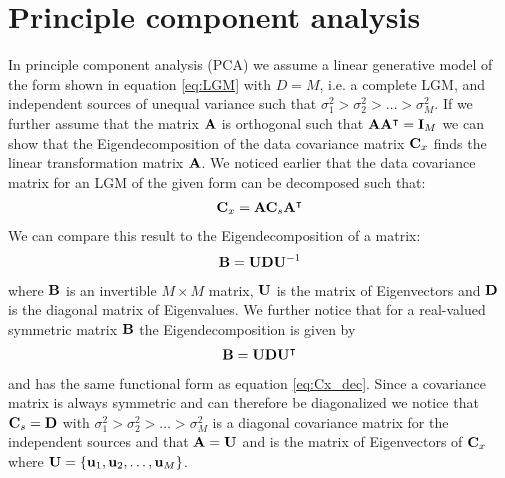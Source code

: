 \section{Principle component analysis}

In principle component analysis (PCA) we assume a linear generative model of the form
shown in equation \eqref{eq:LGM} with $D = M$, i.e. a complete LGM, and independent sources
of unequal variance such that $\sigma_1^2 > \sigma_2^2 > \dots > \sigma_M^2$. 
If we further assume that the matrix $\mathbf{A}$ is orthogonal such that 
$\mathbf{A} \mathbf{A}^\intercal = \operatorname{\mathbf{I}}_M$ we can show that the Eigendecomposition of the data
covariance matrix $\mathbf{C}_x$ finds the linear transformation matrix $\mathbf{A}$.
We noticed earlier that the data covariance matrix for an LGM of the given form 
can be decomposed such that:
\begin{align}
	\mathbf{C}_x = \mathbf{A} \mathbf{C}_s \mathbf{A}^\intercal
	\label{eq:Cx_dec}
\end{align}
We can compare this result to the Eigendecomposition of a matrix:
\begin{align}
	\mathbf{B} = \mathbf{U} \mathbf{D} \mathbf{U}^{-1}
\end{align}
where $\mathbf{B}$ is an invertible $M \times M$ matrix, $\mathbf{U}$ is the matrix of Eigenvectors
and $\mathbf{D}$ is the diagonal matrix of Eigenvalues.
We further notice that for a real-valued symmetric matrix $\mathbf{B}$ the Eigendecomposition
is given by
\begin{align}
	\mathbf{B} = \mathbf{U} \mathbf{D} \mathbf{U}^\intercal
\end{align}
and has the same functional form as equation \eqref{eq:Cx_dec}. Since a covariance matrix
is always symmetric and can therefore be diagonalized we notice that $\mathbf{C}_s = \mathbf{D}$
with $\sigma_1^2 > \sigma_2^2 > \dots > \sigma_M^2$ is a
diagonal covariance matrix for the independent sources and that $\mathbf{A} = \mathbf{U}$ and 
is the matrix of Eigenvectors of $\mathbf{C}_x$ where $\mathbf{U} = \{\mathbf{u}_1, \mathbf{u}_2, \dots, \mathbf{u}_M\}$.

